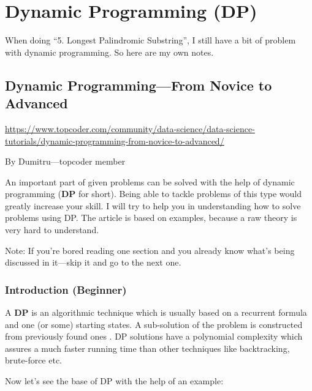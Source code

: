 \chapter[Dynamic Programming]
{Dynamic Programming (DP)
  \label{chDynmcPrgrmmng}}

When doing ``5. Longest Palindromic Substring'', I still have a bit of
problem with dynamic programming. So here are my own notes.


\section{Dynamic Programming---From Novice to Advanced
  \label{secDynmicPrgrmmngFrmNvcToAdvncd}}

\url{https://www.topcoder.com/community/data-science/data-science-tutorials/dynamic-programming-from-novice-to-advanced/}

By Dumitru---topcoder member

An important part of given problems can be solved with the help of dynamic
programming (\textbf{DP} for short). Being able to tackle problems of this
type would greatly increase your skill. I will try to help you in
understanding how to solve problems using DP. The article is based on
examples, because a raw theory is very hard to understand.

Note: If you're bored reading one section and you already know what's being
discussed in it---skip it and go to the next one.

\subsection{Introduction (Beginner)
  \label{subsecDPIntro}}


A \textbf{DP} is an algorithmic technique which is usually based on a
recurrent formula and one (or some) starting states. A sub-solution of the
problem is constructed from previously found ones . DP solutions have a polynomial complexity which assures
a much faster running time than other techniques like backtracking,
brute-force etc.

Now let's see the base of DP with the help of an example:

